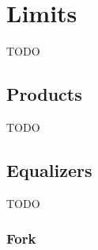 
\section{Limits}
TODO

\subsection{Products}
TODO

\subsection{Equalizers}
TODO
\subsubsection{Fork}

